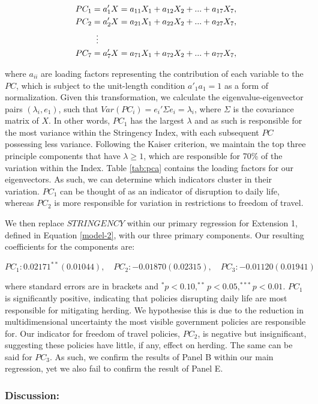 \documentclass[12pt]{article}
\numberwithin{table}{section}   %
\begin{document}
\begin{align*}
  PC_1 & = a'_1X=a_{11}X_1+a_{12}X_2+...+a_{17}X_7, \\
  PC_2 & = a'_2X=a_{21}X_1+a_{22}X_2+...+a_{27}X_7, \\
        & \vdotswithin{ = }\notag \\
  PC_7 & = a'_7X=a_{71}X_1+a_{72}X_2+...+a_{77}X_7,
\end{align*}

where $a_{ii}$ are loading factors representing the contribution of each variable to the $PC$, which is subject to the unit-length condition $a'_1a_1=1$ as a form of normalization. Given this transformation, we calculate the eigenvalue-eigenvector pairs $(\lambda_i,e_1)$, such that $Var(PC_i)=e_i'\Sigma{e_i}=\lambda_i$, where $\Sigma$ is the covariance matrix of $X$. In other words, $PC_1$ has the largest $\lambda$ and as such is responsible for the most variance within the Stringency Index, with each subsequent $PC$  possessing less variance. Following the Kaiser criterion, we maintain the top three principle components that have $\lambda \geq1$, which are responsible for 70\% of the variation within the Index. Table \ref{tab:pca} contains the loading factors for our eigenvectors. As such, we can determine which indicators cluster in their variation. $PC_1$ can be thought of as an indicator of disruption to daily life, whereas $PC_2$ is more responsible for variation in restrictions to freedom of travel. 

We then replace $STRINGENCY$ within our primary regression for Extension 1, defined in Equation \ref{model-2}, with our three primary components. Our resulting coefficients for the components are: 

$$
PC_1:0.02171^{**}(0.01044),\quad PC_2:-0.01870(0.02315), \quad PC_3: -0.01120(0.01941)
$$

where standard errors are in brackets and $^* p<0.10, ^{**} p<0.05, ^{***} p<0.01$. $PC_1$  is significantly positive, indicating that policies disrupting daily life are most responsible for mitigating herding. We hypothesise this is due to the reduction in multidimensional uncertainty the most visible government policies are responsible for. Our indicator for freedom of travel policies, $PC_2$, is negative but insignificant, suggesting these policies have little, if any, effect on herding. The same can be said for $PC_3$. As such, we confirm the results of Panel B within our main regression, yet we also fail to confirm the result of Panel E.

\subsubsection*{Discussion:}
\end{document}
